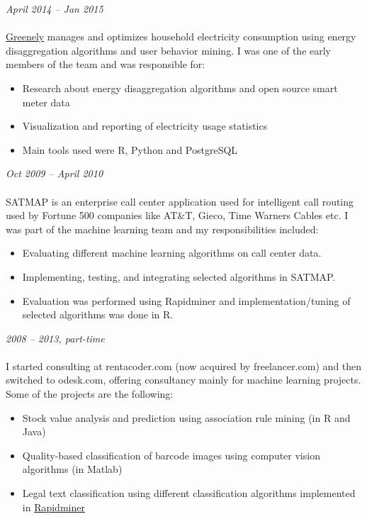 \documentclass[margin, 10pt]{res} %
\begin{document}
\begin{resume}
{\sl \textbf{}} \hfill \textit{April 2014 -- Jan 2015} \\
{\color{RubineRed}{Greenely, Sweden}} \\
\href{http://www.greenely.com}{Greenely} manages and optimizes household electricity consumption using energy disaggregation algorithms and user behavior mining. I was one of the early members of the team and was responsible for:
\begin{itemize} 
\item Research about energy disaggregation algorithms and open source smart meter data
\item Visualization and reporting of electricity usage statistics 
\item Main tools used were R, Python and PostgreSQL
\end{itemize} 

{\sl {}} \hfill \textit{Oct 2009 -- April 2010} \\
{\href{http://www.satmapinc.com/}{\color{RubineRed}{Afiniti (formerly TRG SATMAP), Machine Learning Team, Pakistan}}}  \\
SATMAP is an enterprise call center application used for intelligent call routing used by Fortune 500 companies like AT\&T, Gieco, Time Warners Cables etc. I was part of the machine learning team and my responsibilities included:

\begin{itemize} \itemsep -2pt %
\item Evaluating different machine learning algorithms on call center data. 
\item Implementing, testing, and integrating selected algorithms in SATMAP. 
\item Evaluation was performed using Rapidminer and implementation/tuning of selected algorithms was done in R.
\end{itemize}

{\sl \textbf{}} \hfill \textit{2008 -- 2013, part-time} \\
{\color{RubineRed}{Upwork (formerly Odesk)} } \\
I started consulting at rentacoder.com (now acquired by freelancer.com) and then switched to odesk.com, offering consultancy mainly for machine learning projects. Some of the projects are the following: 
\begin{itemize} \itemsep -2pt %
\item Stock value analysis and prediction using association rule mining (in R and Java)
\item Quality-based classification of barcode images using computer vision algorithms (in Matlab)
\item Legal text classification using different classification algorithms implemented in \href{https://rapidminer.com/}{Rapidminer} 
\end{itemize} 


\end{resume}
\end{document}
